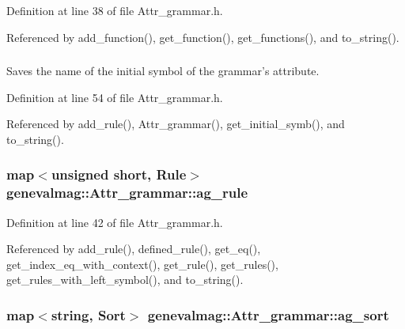 Definition at line 38 of file Attr\_\-grammar.h.

Referenced by add\_\-function(), get\_\-function(), get\_\-functions(), and to\_\-string().\hypertarget{classgenevalmag_1_1Attr__grammar_bdcc6aa17756d47b0e6e131b26050b42}{
\subsubsection[{ag\_\-initial\_\-symb}]{}}
\label{classgenevalmag_1_1Attr__grammar_bdcc6aa17756d47b0e6e131b26050b42}


Saves the name of the initial symbol of the grammar's attribute. 



Definition at line 54 of file Attr\_\-grammar.h.

Referenced by add\_\-rule(), Attr\_\-grammar(), get\_\-initial\_\-symb(), and to\_\-string().\hypertarget{classgenevalmag_1_1Attr__grammar_962f40d15bf80b0e10b27126bd149a93}{
\subsubsection[{ag\_\-rule}]{\setlength{\rightskip}{0pt plus 5cm}map$<$unsigned short, {\bf Rule}$>$ {\bf genevalmag::Attr\_\-grammar::ag\_\-rule}}}
\label{classgenevalmag_1_1Attr__grammar_962f40d15bf80b0e10b27126bd149a93}




Definition at line 42 of file Attr\_\-grammar.h.

Referenced by add\_\-rule(), defined\_\-rule(), get\_\-eq(), get\_\-index\_\-eq\_\-with\_\-context(), get\_\-rule(), get\_\-rules(), get\_\-rules\_\-with\_\-left\_\-symbol(), and to\_\-string().\hypertarget{classgenevalmag_1_1Attr__grammar_799dddeffb394e06770b8143b46cbc87}{
\subsubsection[{ag\_\-sort}]{\setlength{\rightskip}{0pt plus 5cm}map$<$string, {\bf Sort}$>$ {\bf genevalmag::Attr\_\-grammar::ag\_\-sort}}}
\label{classgenevalmag_1_1Attr__grammar_799dddeffb394e06770b8143b46cbc87}




